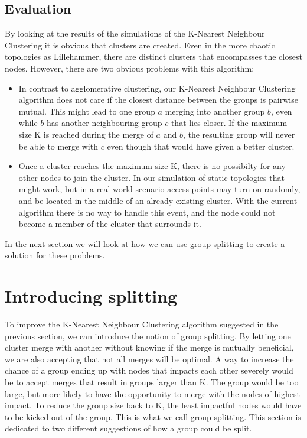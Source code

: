 \subsection{Evaluation}
By looking at the results of the simulations of the K-Nearest Neighbour Clustering it is obvious that clusters are created.  Even in the more chaotic topologies as Lillehammer,
there are distinct clusters that encompasses the closest nodes. However, there are two obvious problems with this algorithm:
\begin{itemize}
	\item In contrast to agglomerative clustering, our K-Nearest Neighbour Clustering algorithm does not care if the closest distance between the groups is pairwise mutual. This
		might lead to one group $a$ merging into another group $b$, even while $b$ has another neighbouring group $c$ that lies closer. If the maximum size K is reached during the merge of
		$a$ and $b$,  the resulting group will never be able to merge with $c$ even though that would have given a better cluster. 
	\item Once a cluster reaches the maximum size K, there is no possibilty for any other nodes to join the cluster.
		In our simulation of static topologies that might work, but in a real world scenario access points may turn on randomly, and be located in the middle of an already existing cluster.
		With the current algorithm there is no way to handle this event, and the node could not become a member of the cluster that surrounds it. 
\end{itemize}

In the next section we will look at how we can use group splitting to create a solution for these problems. 


\section{Introducing splitting}
To improve the K-Nearest Neighbour Clustering algorithm suggested in the previous section, we can introduce the notion of group splitting. By letting one cluster merge with another without knowing
if the merge is mutually beneficial, we are also accepting that not all merges will be optimal. A way to increase the chance of a group ending up with nodes that impacts each other severely
would be to accept merges that result in groups larger than K. The group would be too large, but more likely to have the opportunity to merge with the nodes of highest impact. 
To reduce the group size back to K, the least impactful nodes would have to be kicked out of the group. This is what we call group splitting. 
This section is dedicated to two different suggestions of how a group could be split. 

